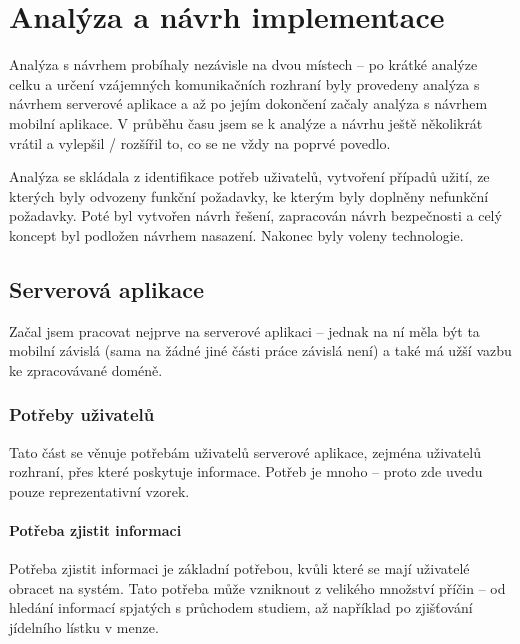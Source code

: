 
\chapter{Analýza a návrh implementace}


Analýza s návrhem probíhaly nezávisle na dvou místech -- po krátké analýze celku a určení vzájemných komunikačních rozhraní byly provedeny analýza s návrhem serverové aplikace a až po jejím dokončení začaly analýza s návrhem mobilní aplikace. V průběhu času jsem se k analýze a návrhu ještě několikrát vrátil a vylepšil / rozšířil to, co se ne vždy na poprvé povedlo.

Analýza se skládala z identifikace potřeb uživatelů, vytvoření případů užití, ze kterých byly odvozeny funkční požadavky, ke kterým byly doplněny nefunkční požadavky. Poté byl vytvořen návrh řešení, zapracován návrh bezpečnosti a celý koncept byl podložen návrhem nasazení. Nakonec byly voleny technologie.

\section{Serverová aplikace}
Začal jsem pracovat nejprve na serverové aplikaci -- jednak na ní měla být ta mobilní závislá (sama na žádné jiné části práce závislá není) a také má užší vazbu ke zpracovávané doméně.


\subsection{Potřeby uživatelů}
\label{sec:server:needs}
Tato část se věnuje potřebám uživatelů serverové aplikace, zejména uživatelů rozhraní, přes které poskytuje informace. Potřeb je mnoho -- proto zde uvedu pouze reprezentativní vzorek.

\subsubsection{Potřeba zjistit informaci}
Potřeba zjistit informaci je základní potřebou, kvůli které se mají uživatelé obracet na systém. Tato potřeba může vzniknout z velikého množství příčin -- od hledání informací spjatých s průchodem studiem, až například po zjišťování jídelního lístku v menze.


